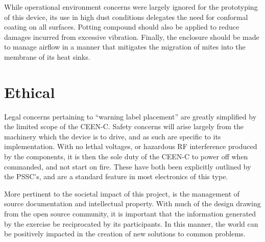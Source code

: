 While operational environment concerns were largely ignored for the prototyping of this device, its use in high dust conditions delegates the need for conformal coating on all surfaces.
Potting compound should also be applied to reduce damages incurred from excessive vibration.
Finally, the enclosure should be made to manage airflow in a manner that mitigates the migration of mites into the membrane of its heat sinks.
 
\section{Ethical}
Legal concerns pertaining to “warning label placement” are greatly simplified by the limited scope of the CEEN-C. 
Safety concerns will arise largely from the machinery which the device is to drive, and as such are specific to its implementation. 
With no lethal voltages, or hazardous RF interference produced by the components, it is then the sole duty of the CEEN-C to power off when commanded, and not start on fire. 
These have both been explicitly outlined by the PSSC’s, and are a standard feature in most electronics of this type.

More pertinent to the societal impact of this project, is the management of source documentation and intellectual property. 
With much of the design drawing from the open source community, it is important that the information generated by the exercise be reciprocated by its participants. 
In this manner, the world can be positively impacted in the creation of new solutions to common problems. 
